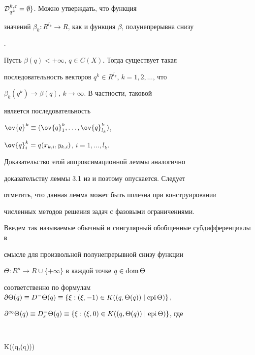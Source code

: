 ${\cal D}^{k, \varepsilon}_{q^k}=\emptyset\}$. Можно утверждать, что функция


значений $\beta_k : R^{l_k}\to R$, как и функция $\beta$, полунепрерывна снизу


\cite{sumin00c}.








\begin{lems}\label{app}


Пусть $\beta(q)<+\infty$, $q\in C(X)$. Тогда существует такая


последовательность векторов $q^k\in R^{l_k}$, $k=1,2,\dotsc$, что


$\beta_k(q^k)\to\beta(q)$, $k\to\infty$. В частности, таковой


является последовательность


$\ov{q}^k\equiv(\ov{q}^k_1,\dotsc,\ov{q}^k_{l_k})$,


$\ov{q}^k_i=q(x_{k, i},y_{k, i})$, $i=1,\dotsc,l_k$.


\end{lems}





Доказательство этой аппроксимационной леммы аналогично 


доказательству леммы 3.1 из \cite{sumin00c} и поэтому опускается. Следует


отметить, что данная лемма может быть полезна при конструировании


численных методов решения задач с фазовыми ограничениями.





Введем так называемые обычный и сингулярный обобщенные субдифференциалы в


смысле \cite{mordukhovich88} для произвольной полунепрерывной снизу функции


$\Theta : R^n\to R\cup\{+\infty\}$ в каждой точке $q\in \operatorname{dom}\Theta$


соответственно по формулам $\partial\Theta(q)\equiv


D^-\Theta(q)\equiv\{\xi : (\xi, -1)\in K((q,\Theta(q))\mid\epi\Theta)\}$,


$\partial^\infty\Theta(q)\equiv D^-_s\Theta(q)\equiv\{\xi : (\xi, 0)\in


K((q,\Theta(q))\mid\epi\Theta)\}$, где


$$


K((q,\Theta(q))\mid\epi\Theta)\equiv


